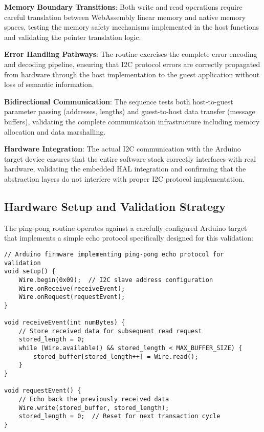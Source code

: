 \textbf{Memory Boundary Transitions}: Both write and read operations require careful translation between WebAssembly linear memory and native memory spaces, testing the memory safety mechanisms implemented in the host functions and validating the pointer translation logic.

\textbf{Error Handling Pathways}: The routine exercises the complete error encoding and decoding pipeline, ensuring that I2C protocol errors are correctly propagated from hardware through the host implementation to the guest application without loss of semantic information.

\textbf{Bidirectional Communication}: The sequence tests both host-to-guest parameter passing (addresses, lengths) and guest-to-host data transfer (message buffers), validating the complete communication infrastructure including memory allocation and data marshalling.

\textbf{Hardware Integration}: The actual I2C communication with the Arduino target device ensures that the entire software stack correctly interfaces with real hardware, validating the embedded HAL integration and confirming that the abstraction layers do not interfere with proper I2C protocol implementation.

\subsection{Hardware Setup and Validation Strategy}

The ping-pong routine operates against a carefully configured Arduino target that implements a simple echo protocol specifically designed for this validation:

\begin{verbatim}
// Arduino firmware implementing ping-pong echo protocol for validation
void setup() {
    Wire.begin(0x09);  // I2C slave address configuration
    Wire.onReceive(receiveEvent);
    Wire.onRequest(requestEvent);
}

void receiveEvent(int numBytes) {
    // Store received data for subsequent read request
    stored_length = 0;
    while (Wire.available() && stored_length < MAX_BUFFER_SIZE) {
        stored_buffer[stored_length++] = Wire.read();
    }
}

void requestEvent() {
    // Echo back the previously received data
    Wire.write(stored_buffer, stored_length);
    stored_length = 0;  // Reset for next transaction cycle
}
\end{verbatim}

